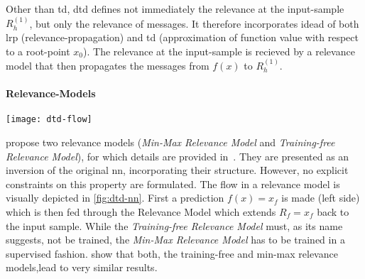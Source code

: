 \par
Other than \gls{td}, \gls{dtd} defines not immediately the relevance at the input-sample \(R_{h}^{(1)}\), but only the relevance of \glspl{message}. It therefore incorporates idead of both \gls{lrp} (relevance-propagation) and \gls{td} (approximation of function value with respect to a root-point \(x_0\)). The relevance at the input-sample is recieved by a relevance model that then propagates the \glspl{message} from \(f(x)\) to \(R_{h}^{(1)}\).
\paragraph{Relevance-Models}
\begin{figure*}
    \center
    \texttt{[image: dtd-flow]}
    \caption{\textbf{Left:} A neural network at prediction time. \textbf{Right:} exemplary \gls{dtd} Relevance Model, adopted from \protect\cite{Montavon.2017}. Note, that in this work, usually \(R_h\) is used instead of \(R_p\).}\label{fig:dtd-nn}
\end{figure*}
 propose two relevance models (\textit{Min-Max Relevance Model} and \textit{Training-free Relevance Model}), for which details are provided in~\cite{Montavon.2017}. They are presented as an inversion of the original \gls{nn}, incorporating their structure. However, no explicit constraints on this property are formulated. The flow in a relevance model is visually depicted in \cref{fig:dtd-nn}. First a prediction \(f(x)=x_f\) is made (left side) which is then fed through the Relevance Model which extends \(R_f=x_f\) back to the input sample. While the \textit{Training-free Relevance Model} must, as its name suggests, not be trained, the \textit{Min-Max Relevance Model} has to be trained in a supervised fashion.  show that both, the training-free and min-max relevance models,lead to very similar results.